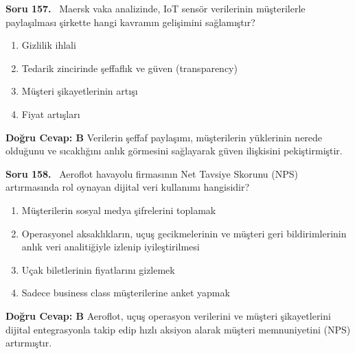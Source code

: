 \documentclass[11pt,a4paper,openany]{book}
\begin{document}
\needspace{5cm}
\vspace{8pt}
\noindent\textbf{\large\sffamily Soru 157.} \ Maersk vaka analizinde, IoT sensör verilerinin müşterilerle paylaşılması şirkette hangi kavramın gelişimini sağlamıştır?
\begin{enumerate}[label=\Alph*), leftmargin=25pt, topsep=4pt, itemsep=2pt]
    \item Gizlilik ihlali
    \item Tedarik zincirinde şeffaflık ve güven (transparency)
    \item Müşteri şikayetlerinin artışı
    \item Fiyat artışları
\end{enumerate}
\vspace{4pt}
\begin{tcolorbox}[title=Cevap ve Açıklama, colback=gray!3!white, colframe=primarycolor!90!black, arc=2mm, fonttitle=\bfseries\sffamily, top=6pt, bottom=6pt]
    \textbf{Doğru Cevap: B}
    \vspace{2pt}
    Verilerin şeffaf paylaşımı, müşterilerin yüklerinin nerede olduğunu ve sıcaklığını anlık görmesini sağlayarak güven ilişkisini pekiştirmiştir.
\end{tcolorbox}
\vspace{10pt}

\needspace{5cm}
\vspace{8pt}
\noindent\textbf{\large\sffamily Soru 158.} \ Aeroflot havayolu firmasının Net Tavsiye Skorunu (NPS) artırmasında rol oynayan dijital veri kullanımı hangisidir?
\begin{enumerate}[label=\Alph*), leftmargin=25pt, topsep=4pt, itemsep=2pt]
    \item Müşterilerin sosyal medya şifrelerini toplamak
    \item Operasyonel aksaklıkların, uçuş gecikmelerinin ve müşteri geri bildirimlerinin anlık veri analitiğiyle izlenip iyileştirilmesi
    \item Uçak biletlerinin fiyatlarını gizlemek
    \item Sadece business class müşterilerine anket yapmak
\end{enumerate}
\vspace{4pt}
\begin{tcolorbox}[title=Cevap ve Açıklama, colback=gray!3!white, colframe=primarycolor!90!black, arc=2mm, fonttitle=\bfseries\sffamily, top=6pt, bottom=6pt]
    \textbf{Doğru Cevap: B}
    \vspace{2pt}
    Aeroflot, uçuş operasyon verilerini ve müşteri şikayetlerini dijital entegrasyonla takip edip hızlı aksiyon alarak müşteri memnuniyetini (NPS) artırmıştır.
\end{tcolorbox}
\vspace{10pt}
\end{document}
